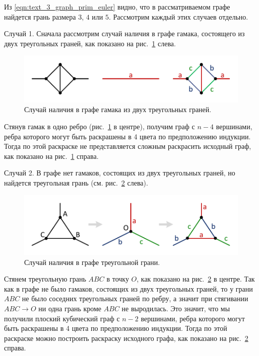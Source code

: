 Из \eqref{eqn:text_3_graph_prim_euler} видно, что в рассматриваемом графе найдется грань размера $3$, $4$ или $5$.
Рассмотрим каждый этих случаев отдельно.

Случай 1. Сначала рассмотрим случай наличия в графе гамака, состоящего из двух треугольных граней, как показано на рис.~\ref{fig:text_3_graph_prim_coloring4_gamak} слева.

\begin{figure}[ht]
\centering
\includegraphics[width=1.0\textwidth]{./pics/text_3_graph_prim/coloring4_gamak.pdf}
\singlespacing
{}\caption{Случай наличия в графе гамака из двух треугольных граней.}
\label{fig:text_3_graph_prim_coloring4_gamak}
\end{figure}

Стянув гамак в одно ребро (рис.~\ref{fig:text_3_graph_prim_coloring4_gamak} в центре), получим граф с $n - 4$ вершинами, ребра которого могут быть раскрашены в 4 цвета по предположению индукции.
Тогда по этой раскраске не представляется сложным раскрасить исходный граф, как показано на рис.~\ref{fig:text_3_graph_prim_coloring4_gamak} справа.

Случай 2. В графе нет гамаков, состоящих из двух треугольных граней, но найдется треугольная грань (см. рис.~\ref{fig:text_3_graph_prim_coloring4_face3} слева).

\begin{figure}[ht]
\centering
\includegraphics[width=1.0\textwidth]{./pics/text_3_graph_prim/coloring4_face3.pdf}
\singlespacing
{}\caption{Случай наличия в графе треугольной грани.}
\label{fig:text_3_graph_prim_coloring4_face3}
\end{figure}

Стянем треугольную грань $ABC$ в точку $O$, как показано на рис.~\ref{fig:text_3_graph_prim_coloring4_face3} в центре.
Так как в графе не было гамаков, состоящих из двух треугольных граней, то у грани $ABC$ не было соседних треугольных граней по ребру, а значит при стягивании $ABC \rightarrow O$ ни одна грань кроме $ABC$ не выродилась.
Это значит, что мы получили плоский кубический граф с $n - 2$ вершинами, ребра которого могут быть раскрашены в 4 цвета по предположению индукции.
Тогда по этой раскраске можно построить раскраску исходного графа, как показано на рис.~\ref{fig:text_3_graph_prim_coloring4_face3} справа.

